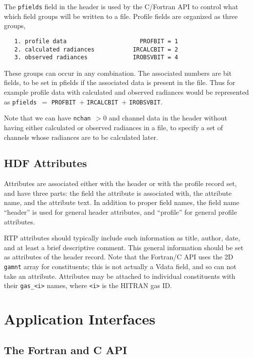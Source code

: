 \documentclass[11pt]{article}
\begin{document}
The {\tt pfields} field in the header is used by the C/Fortran API
to control what which field groups will be written to a file.  Profile
fields are organized as three groups,

{\small
\begin{verbatim}
   1. profile data                     PROFBIT = 1
   2. calculated radiances           IRCALCBIT = 2
   3. observed radiances             IROBSVBIT = 4
\end{verbatim}
}

These groups can occur in any combination.  The associated numbers
are bit fields, to be set in pfields if the associated data is
present in the file.  Thus for example profile data with calculated
and observed radiances would be represented as {\tt pfields}~$=$
{\tt PROFBIT}~$+$ {\tt IRCALCBIT}~$+$ {\tt IROBSVBIT}.

Note that we can have {\tt nchan}~$>0$ and channel data in the
header without having either calculated or observed radiances in a
file, to specify a set of channels whose radiances are to be
calculated later.

\subsection{HDF Attributes}

Attributes are associated either with the header or with the
profile record set, and have three parts: the field the attribute
is associated with, the attribute name, and the attribute text.  In
addition to proper field names, the field name ``header'' is used
for general header attributes, and ``profile'' for general profile
attributes.

RTP attributes should typically include such information as title,
author, date, and at least a brief descriptive comment.  This
general information should be set as attributes of the header
record.  Note that the Fortran/C API uses the 2D {\tt gamnt} array
for constituents; this is not actually a Vdata field, and so can not
take an attribute.  Attributes may be attached to individual
constituents with their {\tt gas\_<i>} names, where {\tt <i>} is the
HITRAN gas ID.

\section{Application Interfaces}

\subsection{The Fortran and C API}
\end{document}
